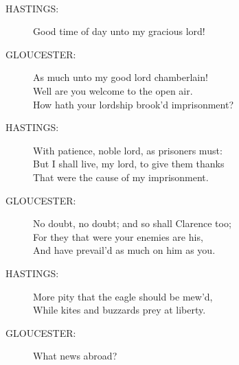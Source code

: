 \documentclass{article}
\begin{document}
\\
\begin{description}
\item[HASTINGS:] 
\hspace{1pt}Good time of day unto my gracious lord!\\
\end{description}
\begin{description}
\item[GLOUCESTER:] 
\hspace{1pt}As much unto my good lord chamberlain!\\
\hspace{1pt}Well are you welcome to the open air.\\
\hspace{1pt}How hath your lordship brook'd imprisonment?\\
\end{description}
\begin{description}
\item[HASTINGS:] 
\hspace{1pt}With patience, noble lord, as prisoners must:\\
\hspace{1pt}But I shall live, my lord, to give them thanks\\
\hspace{1pt}That were the cause of my imprisonment.\\
\end{description}
\begin{description}
\item[GLOUCESTER:] 
\hspace{1pt}No doubt, no doubt; and so shall Clarence too;\\
\hspace{1pt}For they that were your enemies are his,\\
\hspace{1pt}And have prevail'd as much on him as you.\\
\end{description}
\begin{description}
\item[HASTINGS:] 
\hspace{1pt}More pity that the eagle should be mew'd,\\
\hspace{1pt}While kites and buzzards prey at liberty.\\
\end{description}
\begin{description}
\item[GLOUCESTER:] 
\hspace{1pt}What news abroad?\\
\end{description}
\end{document}

